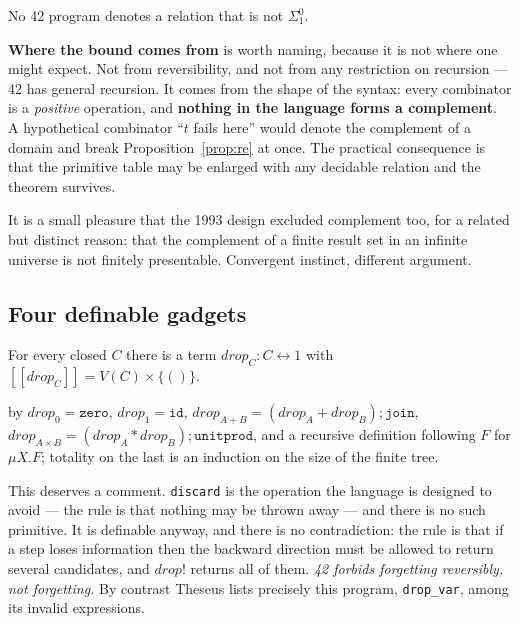 \documentclass[runningheads,envcountsame]{llncs}
\newcommand{\den}[1]{\ensuremath{[\![#1]\!]}}
\newcommand{\iso}{\leftrightarrow}
\begin{document}
\begin{corollary}
No 42 program denotes a relation that is not $\Sigma^0_1$.
\end{corollary}

\textbf{Where the bound comes from} is worth naming, because it is not where one
might expect. Not from reversibility, and not from any restriction on recursion ---
42 has general recursion. It comes from the shape of the syntax: every combinator
is a \emph{positive} operation, and \textbf{nothing in the language forms a
complement}. A hypothetical combinator ``$t$ fails here'' would denote the
complement of a domain and break Proposition~\ref{prop:re} at once. The practical
consequence is that the primitive table may be enlarged with any decidable relation
and the theorem survives.

It is a small pleasure that the 1993 design excluded complement too, for a related
but distinct reason: that the complement of a finite result set in an infinite
universe is not finitely presentable. Convergent instinct, different argument.

\subsection{Four definable gadgets}\label{sec:gadgets}

\begin{lemma}[Discard]\label{lem:drop}
For every closed $C$ there is a term $\mathit{drop}_C : C \iso 1$ with
$\den{\mathit{drop}_C} = V(C) \times \{()\}$.
\end{lemma}

by $\mathit{drop}_0 = \texttt{zero}$, $\mathit{drop}_1 = \texttt{id}$,
$\mathit{drop}_{A+B} = (\mathit{drop}_A + \mathit{drop}_B)\mathbin{;}\texttt{join}$,
$\mathit{drop}_{A\times B} = (\mathit{drop}_A * \mathit{drop}_B)\mathbin{;}\texttt{unitprod}$,
and a recursive definition following $F$ for $\mu X.F$; totality on the last is an
induction on the size of the finite tree.

This deserves a comment. \texttt{discard} is the operation the language is designed
to avoid --- the rule is that nothing may be thrown away --- and there is no such
primitive. It is definable anyway, and there is no contradiction: the rule is that
if a step loses information then the backward direction must be allowed to return
several candidates, and $\mathit{drop}!$ returns all of them. \emph{42 forbids
forgetting reversibly, not forgetting.} By contrast Theseus lists precisely this
program, \texttt{drop\_var}, among its invalid expressions.
\end{document}
